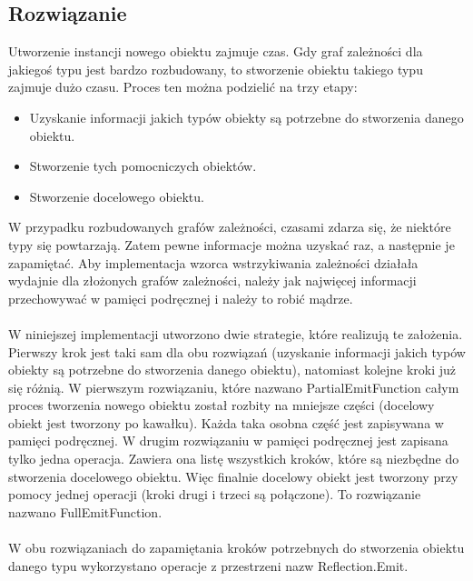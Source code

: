 \documentclass[12pt]{article}
\begin{document}
\subsection{Rozwiązanie}
Utworzenie instancji nowego obiektu zajmuje czas. Gdy graf zależności dla jakiegoś typu jest bardzo rozbudowany, to stworzenie obiektu takiego typu zajmuje dużo czasu. Proces ten można podzielić na trzy etapy:
\begin{itemize}
	\item Uzyskanie informacji jakich typów obiekty są potrzebne do stworzenia danego obiektu.
	\item Stworzenie tych pomocniczych obiektów.
	\item Stworzenie docelowego obiektu.
\end{itemize}
W przypadku rozbudowanych grafów zależności, czasami zdarza się, że niektóre typy się powtarzają. Zatem pewne informacje można uzyskać raz, a następnie je zapamiętać. Aby implementacja wzorca wstrzykiwania zależności działała wydajnie dla złożonych grafów zależności, należy jak najwięcej informacji przechowywać w pamięci podręcznej i należy to robić mądrze.\\
\\
W niniejszej implementacji utworzono dwie strategie, które realizują te założenia. Pierwszy krok jest taki sam dla obu rozwiązań (uzyskanie informacji jakich typów obiekty są potrzebne do stworzenia danego obiektu), natomiast kolejne kroki już się różnią. W pierwszym rozwiązaniu, które nazwano PartialEmitFunction całym proces tworzenia nowego obiektu został rozbity na mniejsze części (docelowy obiekt jest tworzony po kawałku). Każda taka osobna część jest zapisywana w pamięci podręcznej. W drugim rozwiązaniu w pamięci podręcznej jest zapisana tylko jedna operacja. Zawiera ona listę wszystkich kroków, które są niezbędne do stworzenia docelowego obiektu. Więc finalnie docelowy obiekt jest tworzony przy pomocy jednej operacji (kroki drugi i trzeci są połączone). To rozwiązanie nazwano FullEmitFunction.\\
\\
W obu rozwiązaniach do zapamiętania kroków potrzebnych do stworzenia obiektu danego typu wykorzystano operacje z przestrzeni nazw Reflection.Emit.
\end{document}

